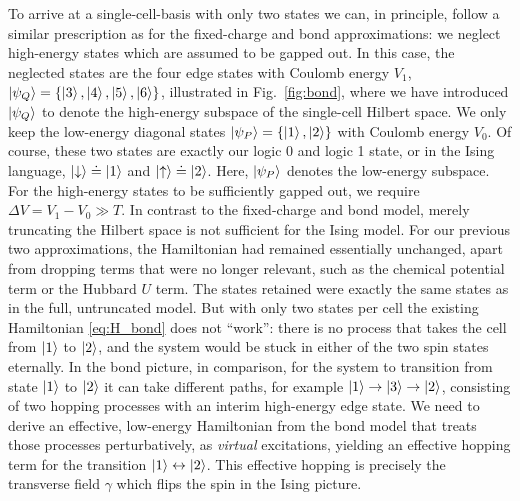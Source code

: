 To arrive at a single-cell-basis with only two states we can, in principle,
follow a similar prescription as for the fixed-charge and bond approximations:
we neglect high-energy states which are assumed to be gapped out. In this case,
the neglected states are the four edge states with Coulomb energy $V_1$,
$\left|\psi_Q\right> = \left\{ \left|3\right>, \left|4\right>, \left|5\right>, \left|6\right> \right\}$,
illustrated in Fig.~\ref{fig:bond}, where we have introduced $\left|\psi_Q\right>$ to
denote the high-energy subspace of the single-cell Hilbert space. We only keep
the low-energy diagonal states $\left|\psi_P\right> = \left\{ \left|1\right>, \left|2\right>
\right\}$ with Coulomb energy $V_0$. Of course, these two states are exactly our
logic 0 and logic 1 state, or in the Ising language, $\left|\downarrow\right> \doteq
\left|1\right>$ and $\left|\uparrow\right> \doteq \left|2\right>$. Here, $\left|\psi_P\right>$ denotes the
low-energy subspace. For the high-energy states to be sufficiently gapped out,
we require $\Delta V = V_1 - V_0 \gg T$. In contrast to the fixed-charge and
bond model, merely truncating the Hilbert space is not sufficient for the Ising
model. For our previous two approximations, the Hamiltonian had remained
essentially unchanged, apart from dropping terms that were no longer relevant,
such as the chemical potential term or the Hubbard $U$ term. The states retained
were exactly the same states as in the full, untruncated model. But with only
two states per cell the existing Hamiltonian \eqref{eq:H_bond} does not
``work'': there is no process that takes the cell from $\left|1\right>$ to $\left|2\right>$,
and the system would be stuck in either of the two spin states eternally. In the
bond picture, in comparison, for the system to transition from state $\left|1\right>$
to $\left|2\right>$ it can take different paths, for example $\left|1\right> \rightarrow
\left|3\right> \rightarrow \left|2\right>$, consisting of two hopping processes with an
interim high-energy edge state. We need to derive an effective, low-energy
Hamiltonian from the bond model that treats those processes perturbatively, as
\emph{virtual} excitations, yielding an effective hopping term for the
transition $\left|1\right> \leftrightarrow \left|2\right>$. This effective hopping is
precisely the transverse field $\gamma$ which flips the spin in the Ising
picture.

